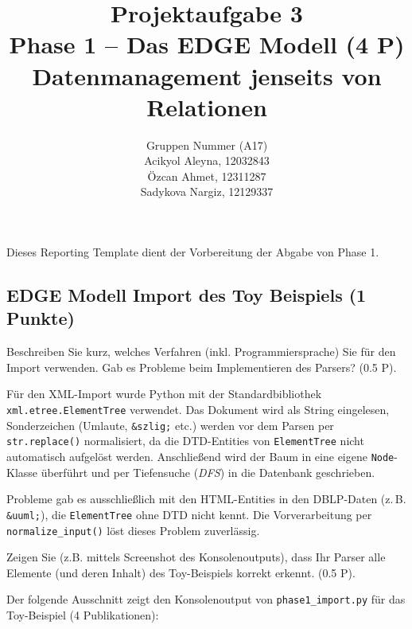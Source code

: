 \documentclass[11pt]{scrartcl}
\title{
  \textbf{\large Projektaufgabe 3 } \\
  Phase 1 – Das EDGE Modell (4 P) \\
  {\large Datenmanagement jenseits von Relationen}
}
\author{
  Gruppen Nummer (A17) \\
  \large Acikyol Aleyna, 12032843 \\
  \large Özcan Ahmet, 12311287 \\
  \large Sadykova Nargiz, 12129337
}
\begin{document}
\maketitle\thispagestyle{empty}

Dieses Reporting Template dient der Vorbereitung der Abgabe von Phase 1.

\subsection*{EDGE Modell Import des Toy Beispiels (1 Punkte)}

Beschreiben Sie kurz, welches Verfahren (inkl. Programmiersprache) Sie für den Import verwenden. Gab es Probleme beim Implementieren des Parsers? (0.5 P).

Für den XML-Import wurde Python mit der Standardbibliothek \texttt{xml.etree.ElementTree} verwendet.
Das Dokument wird als String eingelesen, Sonderzeichen (Umlaute, \texttt{\&szlig;} etc.) werden vor dem
Parsen per \texttt{str.replace()} normalisiert, da die DTD-Entities von \texttt{ElementTree} nicht
automatisch aufgelöst werden. Anschließend wird der Baum in eine eigene \texttt{Node}-Klasse überführt
und per Tiefensuche (\emph{DFS}) in die Datenbank geschrieben.

Probleme gab es ausschließlich mit den HTML-Entities in den DBLP-Daten (z.\,B. \texttt{\&uuml;}),
die \texttt{ElementTree} ohne DTD nicht kennt. Die Vorverarbeitung per \texttt{normalize\_input()}
löst dieses Problem zuverlässig.

Zeigen Sie (z.B. mittels Screenshot des Konsolenoutputs), dass Ihr Parser alle Elemente (und deren Inhalt) des Toy-Beispiels korrekt erkennt. (0.5 P).

Der folgende Ausschnitt zeigt den Konsolenoutput von \texttt{phase1\_import.py} für das Toy-Beispiel
(4 Publikationen):
\end{document}
